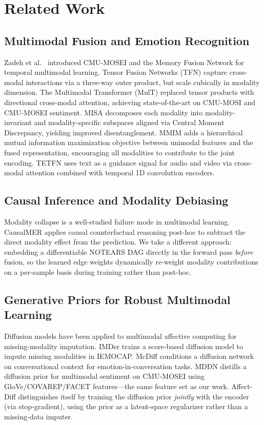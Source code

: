 \documentclass[conference]{IEEEtran}
\begin{document}
\section{Related Work}

\subsection{Multimodal Fusion and Emotion Recognition}
Zadeh et al.\ \cite{zadeh2018mosei} introduced CMU-MOSEI and the Memory Fusion
Network for temporal multimodal learning.  Tensor Fusion Networks (TFN)
\cite{zadeh2017tfn} capture cross-modal interactions via a three-way outer
product, but scale cubically in modality dimension.  The Multimodal Transformer
(MulT) \cite{tsai2019mult} replaced tensor products with directional cross-modal
attention, achieving state-of-the-art on CMU-MOSI and CMU-MOSEI sentiment.
MISA \cite{hazarika2020misa} decomposes each modality into modality-invariant
and modality-specific subspaces aligned via Central Moment Discrepancy, yielding
improved disentanglement.  MMIM \cite{han2021mmim} adds a hierarchical mutual
information maximization objective between unimodal features and the fused
representation, encouraging all modalities to contribute to the joint encoding.
TETFN \cite{yang2022tetfn} uses text as a guidance signal for audio and video
via cross-modal attention combined with temporal 1D convolution encoders.

\subsection{Causal Inference and Modality Debiasing}
Modality collapse is a well-studied failure mode in multimodal learning.
CausalMER \cite{causalmer2024} applies causal counterfactual reasoning
post-hoc to subtract the direct modality effect from the prediction.
We take a different approach: embedding a differentiable NOTEARS DAG
\cite{zheng2018notears} directly in the forward pass \emph{before} fusion,
so the learned edge weights dynamically re-weight modality contributions
on a per-sample basis during training rather than post-hoc.

\subsection{Generative Priors for Robust Multimodal Learning}
Diffusion models have been applied to multimodal affective computing for
missing-modality imputation.  IMDer \cite{imder2024} trains a score-based
diffusion model to impute missing modalities in IEMOCAP.  McDiff
\cite{mcdiff2025} conditions a diffusion network on conversational context
for emotion-in-conversation tasks.  MDDN \cite{mddn2025} distills a
diffusion prior for multimodal sentiment on CMU-MOSEI using GloVe/COVAREP/FACET
features---the same feature set as our work.  Affect-Diff distinguishes
itself by training the diffusion prior \emph{jointly} with the encoder
(via stop-gradient), using the prior as a latent-space regularizer rather
than a missing-data imputer.
\end{document}
